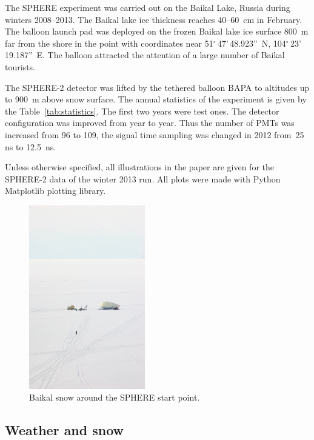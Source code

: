 \documentclass[final,5p,times,twocolumn]{elsarticle}
\begin{document}
The SPHERE experiment was carried out on the Baikal Lake, Russia during winters 2008--2013. The Baikal lake ice thickness reaches 40--60~cm in February. The balloon launch pad was deployed on the frozen Baikal lake ice surface 800~m far from the shore in the point with coordinates near 51$^\circ$\,47'\,48.923''~N, 104$^\circ$\,23'\,19.187''~E. 
The balloon attracted the attention of a large number of Baikal tourists. 

The \mbox{SPHERE-2} detector was lifted by the tethered balloon BAPA to altitudes up to 900~m above snow surface. The annual statistics of the experiment is given by the Table~\ref{tab:statistics}. The first two years were test ones. The detector configuration was improved from year to year. Thus the number of PMTs was increased from 96 to 109, the signal time sampling was changed in 2012 from~25 ns to 12.5~ns.

Unless otherwise specified, all illustrations in the paper are given for the \mbox{SPHERE-2} data of the winter 2013 run. All plots were made with Python Matplotlib plotting library.

\begin{figure}[tb]
    \includegraphics[width=0.45\textwidth]{figs/DSC_4049.jpg}\hspace{2pc}%
    \caption{Baikal snow around the SPHERE start point.}
\label{fig:baikal_snow}
\end{figure}

\subsection{Weather and snow}
\end{document}
